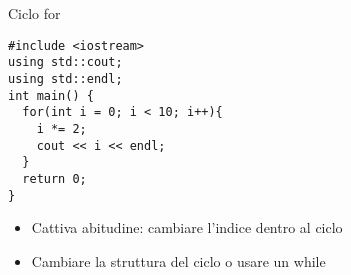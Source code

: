 \documentclass[xcolor=dvipsnames,handout]{beamer}
\begin{document}
\begin{frame}[fragile]{Ciclo for}
  \vfill
  \begin{lstlisting}
#include <iostream>
using std::cout;
using std::endl;
int main() {
  for(int i = 0; i < 10; i++){
    i *= 2;
    cout << i << endl;
  }
  return 0;
}
  \end{lstlisting}
  \vfill
  \begin{itemize}
    \item Cattiva abitudine: cambiare l'indice dentro al ciclo
    \vfill
    \item Cambiare la struttura del ciclo o usare un while
  \end{itemize}
  \vfill
\end{frame}
\end{document}
